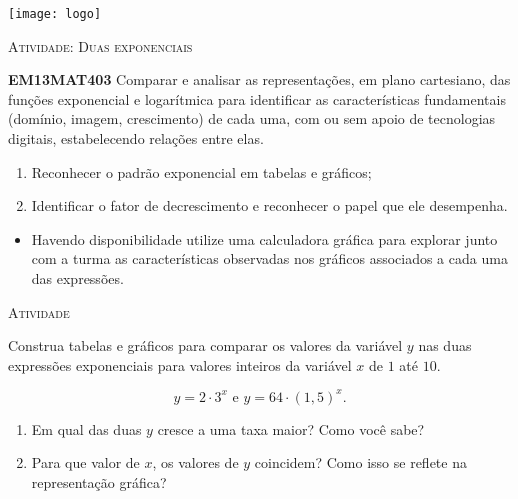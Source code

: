 \documentclass[10 pt,usenames,dvipsnames, oneside]{article}
\begin{document}
\begin{center}
  \begin{minipage}[l]{3cm}
\texttt{[image: logo]}    
\end{minipage}\hfill
\begin{minipage}[r]{.8\textwidth}
 {\Large \scshape Atividade: Duas exponenciais}  
\end{minipage}
\end{center}
\vspace{.2cm}

\ifdefined\prof
\begin{objetivos}
\item \textbf{EM13MAT403} Comparar e analisar as representações, em plano cartesiano, das funções exponencial e logarítmica para identificar as características fundamentais (domínio, imagem, crescimento) de cada uma, com ou sem apoio de tecnologias digitais, estabelecendo relações entre elas.
\end{objetivos}

\begin{goals}
\begin{enumerate}
	\item Reconhecer o padrão exponencial em tabelas e gráficos;
	\item Identificar o fator de decrescimento e reconhecer o papel que ele desempenha.
\end{enumerate}

\tcblower

\begin{itemize}
	\item Havendo disponibilidade utilize uma calculadora gráfica para explorar junto com a turma as características observadas nos gráficos associados a cada uma das expressões.
\end{itemize}
\end{goals}

\bigskip
\begin{center}
{\large \scshape Atividade}
\end{center}
\fi

Construa tabelas e gráficos para comparar os valores da variável $y$ nas duas expressões exponenciais para valores inteiros da variável $x$ de $1$ até $10$.

\[
y=2 \cdot 3^{x}  \text{ e } y=64 \cdot (1{,}5)^{x}.
\]

\begin{enumerate}

\item{}
Em qual das duas $y$ cresce a uma taxa maior? Como você sabe?

\item{}
Para que valor de $x$, os valores de $y$ coincidem? Como isso se reflete na representação gráfica?


\end{enumerate}
\end{document}
